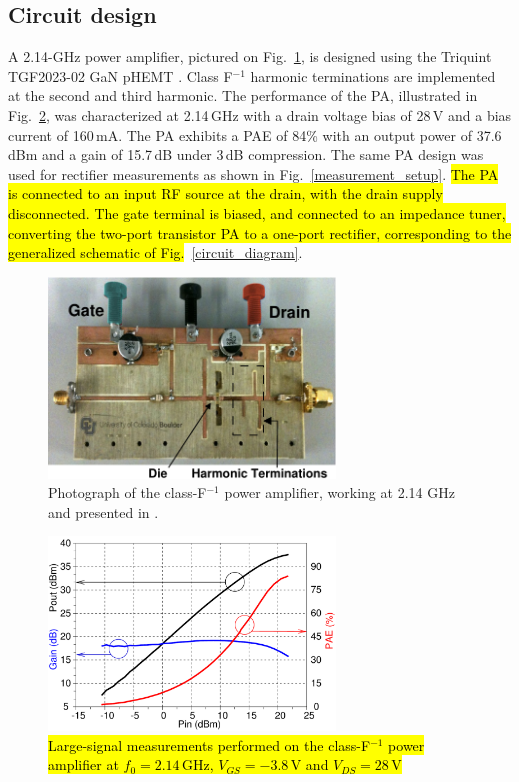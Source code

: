 \subsection {Circuit design}

A 2.14-GHz power amplifier, pictured on Fig.~\ref{amplifier}, is designed using the Triquint TGF2023-02 GaN pHEMT \cite{gan_pa_letter}. Class F$^{-1}$ harmonic terminations are implemented at the second and third harmonic. The performance of the PA, illustrated in  Fig.~\ref{PA_meas}, was characterized at 2.14\,GHz with a drain voltage bias of 28\,V and a bias current of 160\,mA. The PA exhibits a PAE of 84\% with an output power of 37.6\,dBm and a gain of 15.7\,dB under 3\,dB compression. The same PA design was used for rectifier measurements as shown in Fig.~\ref{measurement_setup}. \hl{The PA is connected to an input RF source at the drain, with the drain supply disconnected. The gate terminal is biased, and connected to an impedance tuner, converting the two-port transistor PA to a one-port rectifier, corresponding to the generalized schematic of Fig.}~\ref{circuit_diagram}.

\begin{figure}[ht!]
\centering
\includegraphics[width=3.0in]{pdf/08.pdf}
\caption{Photograph of the class-F$^{-1}$ power amplifier, working at 2.14 GHz and presented in \cite{gan_pa_letter}.}
\label{amplifier}
\end{figure}


\begin{figure}
  \begin{center}
  \includegraphics[width=3.0in]{pdf/09.pdf}
  \caption{\hl{Large-signal measurements performed on the class-F$^{-1}$ power amplifier at $f_0=2.14$\,GHz, $V_{GS}=-3.8$\,V and $V_{DS}=28$\,V}}
\label{PA_meas}
  \end{center}
\end{figure}









